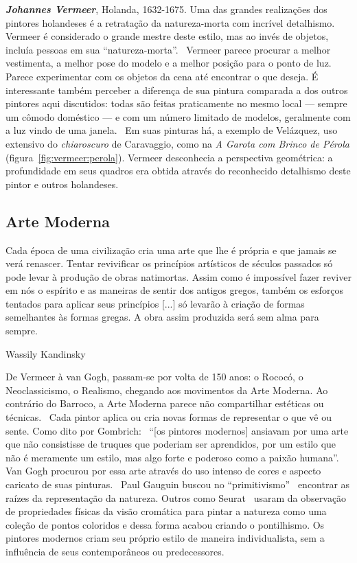 \textbf{\emph{Johannes Vermeer}}, Holanda, 1632-1675. Uma das grandes realizações dos
pintores holandeses é a retratação da natureza-morta com incrível
detalhismo.~\cite{wadum} Vermeer é considerado o grande mestre deste
estilo, mas ao invés de objetos, incluía pessoas em sua
``natureza-morta''.~\cite{gombrich} Vermeer parece procurar a melhor
vestimenta, a melhor pose do modelo e a melhor posição para o ponto de
luz. Parece experimentar com os objetos da cena até encontrar o que
deseja. É interessante também perceber a diferença de sua pintura
comparada a dos outros pintores aqui discutidos: todas são feitas
praticamente no mesmo local --- sempre um cômodo doméstico --- e com
um número limitado de modelos, geralmente com a luz vindo de uma
janela.~\cite{wadum}  Em suas pinturas há, a exemplo de Velázquez,
uso extensivo do \textit{chiaroscuro} de Caravaggio, como na \textit{A
Garota com Brinco de Pérola}
(figura~\ref{fig:vermeer:perola}). Vermeer desconhecia a perspectiva
geométrica: a profundidade em seus quadros era obtida através do
reconhecido detalhismo deste pintor e outros holandeses.



\subsection{Arte Moderna}

\setlength{\epigraphwidth}{0.8\textwidth}
\epigraph{Cada época de uma civilização cria uma arte que lhe é própria e que
  jamais se verá renascer. Tentar revivificar os princípios artísticos de
  séculos passados só pode levar à produção de obras natimortas. Assim como é
  impossível fazer reviver em nós o espírito e as maneiras de sentir dos antigos
  gregos, também os esforços tentados para aplicar seus princípios [...] só
  levarão à criação de formas semelhantes às formas gregas. A obra assim
  produzida será sem alma para sempre.}{Wassily Kandinsky~\cite{kandinsky}}

De Vermeer à van Gogh, passam-se por volta de 150 anos: o Rococó, o
Neoclassicismo, o Realismo, chegando aos movimentos da Arte
Moderna. Ao contrário do Barroco, a Arte Moderna parece não
compartilhar estéticas ou técnicas.~\cite{dempsey} Cada pintor aplica
ou cria novas formas de representar o que vê ou sente. Como dito por
Gombrich:~\cite{gombrich} ``[os pintores modernos] ansiavam por uma
arte que não consistisse de truques que poderiam ser aprendidos, por
um estilo que não é meramente um estilo, mas algo forte e poderoso
como a paixão humana''. Van Gogh procurou por essa arte através do uso
intenso de cores e aspecto caricato de suas pinturas.~\cite{hulsker}
Paul Gauguin buscou no ``primitivismo''~\cite{lovejoy} encontrar as
raízes da representação da natureza. Outros como Seurat~\cite{kemp}
usaram da observação de propriedades físicas da visão cromática para
pintar a natureza como uma coleção de pontos coloridos e dessa forma
acabou criando o pontilhismo. Os pintores modernos criam seu próprio
estilo de maneira individualista, sem a influência de seus
contemporâneos ou predecessores.~\cite{gombrich}

